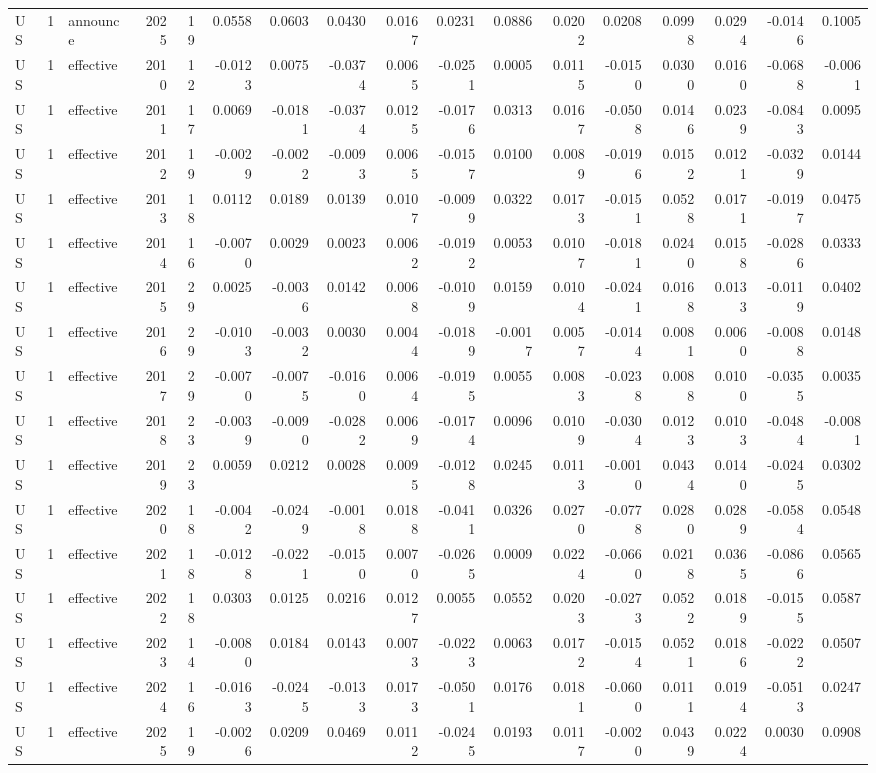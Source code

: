 \begin{tabular}{lrlrrrrrrrrrrrrrr}
US & 1 & announce & 2025 & 19 & 0.0558 & 0.0603 & 0.0430 & 0.0167 & 0.0231 & 0.0886 & 0.0202 & 0.0208 & 0.0998 & 0.0294 & -0.0146 & 0.1005 \\
US & 1 & effective & 2010 & 12 & -0.0123 & 0.0075 & -0.0374 & 0.0065 & -0.0251 & 0.0005 & 0.0115 & -0.0150 & 0.0300 & 0.0160 & -0.0688 & -0.0061 \\
US & 1 & effective & 2011 & 17 & 0.0069 & -0.0181 & -0.0374 & 0.0125 & -0.0176 & 0.0313 & 0.0167 & -0.0508 & 0.0146 & 0.0239 & -0.0843 & 0.0095 \\
US & 1 & effective & 2012 & 19 & -0.0029 & -0.0022 & -0.0093 & 0.0065 & -0.0157 & 0.0100 & 0.0089 & -0.0196 & 0.0152 & 0.0121 & -0.0329 & 0.0144 \\
US & 1 & effective & 2013 & 18 & 0.0112 & 0.0189 & 0.0139 & 0.0107 & -0.0099 & 0.0322 & 0.0173 & -0.0151 & 0.0528 & 0.0171 & -0.0197 & 0.0475 \\
US & 1 & effective & 2014 & 16 & -0.0070 & 0.0029 & 0.0023 & 0.0062 & -0.0192 & 0.0053 & 0.0107 & -0.0181 & 0.0240 & 0.0158 & -0.0286 & 0.0333 \\
US & 1 & effective & 2015 & 29 & 0.0025 & -0.0036 & 0.0142 & 0.0068 & -0.0109 & 0.0159 & 0.0104 & -0.0241 & 0.0168 & 0.0133 & -0.0119 & 0.0402 \\
US & 1 & effective & 2016 & 29 & -0.0103 & -0.0032 & 0.0030 & 0.0044 & -0.0189 & -0.0017 & 0.0057 & -0.0144 & 0.0081 & 0.0060 & -0.0088 & 0.0148 \\
US & 1 & effective & 2017 & 29 & -0.0070 & -0.0075 & -0.0160 & 0.0064 & -0.0195 & 0.0055 & 0.0083 & -0.0238 & 0.0088 & 0.0100 & -0.0355 & 0.0035 \\
US & 1 & effective & 2018 & 23 & -0.0039 & -0.0090 & -0.0282 & 0.0069 & -0.0174 & 0.0096 & 0.0109 & -0.0304 & 0.0123 & 0.0103 & -0.0484 & -0.0081 \\
US & 1 & effective & 2019 & 23 & 0.0059 & 0.0212 & 0.0028 & 0.0095 & -0.0128 & 0.0245 & 0.0113 & -0.0010 & 0.0434 & 0.0140 & -0.0245 & 0.0302 \\
US & 1 & effective & 2020 & 18 & -0.0042 & -0.0249 & -0.0018 & 0.0188 & -0.0411 & 0.0326 & 0.0270 & -0.0778 & 0.0280 & 0.0289 & -0.0584 & 0.0548 \\
US & 1 & effective & 2021 & 18 & -0.0128 & -0.0221 & -0.0150 & 0.0070 & -0.0265 & 0.0009 & 0.0224 & -0.0660 & 0.0218 & 0.0365 & -0.0866 & 0.0565 \\
US & 1 & effective & 2022 & 18 & 0.0303 & 0.0125 & 0.0216 & 0.0127 & 0.0055 & 0.0552 & 0.0203 & -0.0273 & 0.0522 & 0.0189 & -0.0155 & 0.0587 \\
US & 1 & effective & 2023 & 14 & -0.0080 & 0.0184 & 0.0143 & 0.0073 & -0.0223 & 0.0063 & 0.0172 & -0.0154 & 0.0521 & 0.0186 & -0.0222 & 0.0507 \\
US & 1 & effective & 2024 & 16 & -0.0163 & -0.0245 & -0.0133 & 0.0173 & -0.0501 & 0.0176 & 0.0181 & -0.0600 & 0.0111 & 0.0194 & -0.0513 & 0.0247 \\
US & 1 & effective & 2025 & 19 & -0.0026 & 0.0209 & 0.0469 & 0.0112 & -0.0245 & 0.0193 & 0.0117 & -0.0020 & 0.0439 & 0.0224 & 0.0030 & 0.0908 \\
\bottomrule
\end{tabular}
